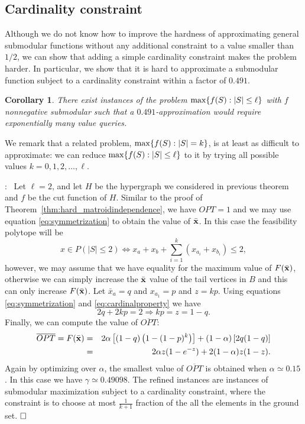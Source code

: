 \documentclass{article}[11pt]
\newtheorem{corollary}[theorem]{Corollary}
\renewenvironment{proof}{\noindent{\bf Proof}:~}{$\hfill \Box$\\}
\def\bx{{\bf x}}
\def\max{{\rm{max}}}
\begin{document}
\subsection{Cardinality constraint}

Although we do not know how to improve the hardness of approximating general submodular
functions without any additional constraint to a value smaller than $1/2$, we can show
that adding a simple cardinality constraint makes the problem harder. In particular,
we show that it is hard to approximate a submodular function subject to a cardinality
constraint within a factor of $0.491$. 

\begin{corollary}
There exist instances of the problem $\max\{f(S):|S| \leq \ell\}$ with $f$ nonnegative submodular
such that a $0.491$-approximation would require exponentially many value queries.
\end{corollary} 

We remark that a related problem, $\max \{f(S): |S|=k\}$, is at least as difficult
to approximate: we can reduce $\max \{f(S): |S| \leq \ell\}$ to it by trying
all possible values $k=0,1,2,\ldots,\ell$.

\medskip

\begin{proof}
Let $\ell=2$, and let $H$ be the hypergraph we considered in previous theorem
and $f$ be the cut function of $H$. Similar to the proof of 
Theorem~\ref{thm:hard_matroidindependence}, we have $OPT=1$ and we may use
equation \eqref{eq:symmetrization} to obtain the value of $\bar{\bx}$.
In this case the feasibility polytope will be
\begin{equation}
\label{eq:cardinalproperty}
x\in P(|S|\leq 2) \Leftrightarrow 
 x_a+x_b+\sum_{i=1}^k (x_{a_i}+x_{b_i})\leq 2,
\end{equation}
however, we may assume that we have equality for the maximum value of $F(\bar{\bx})$,
otherwise we can simply increase the $\bar{\bx}$ value of the tail vertices in $B$
and this can only increase $F(\bar{\bx})$. Let $\bar{x}_a=q$ and $x_{a_1}=p$ and $z=kp$.
Using equations \eqref{eq:symmetrization} and \eqref{eq:cardinalproperty} we have
$$
2q + 2kp=2 \Rightarrow kp=z=1-q.
$$
Finally, we can compute the value of $\overline{OPT}$:
\begin{eqnarray*}
\overline{OPT}=F(\bar{\bx}) & = & 2\alpha\left[(1-q) \left(1-(1-p)^k\right)\right]
 + (1-\alpha)\left[2q(1-q)\right]\\
 & = & 2\alpha z(1-e^{-z}) + 2(1-\alpha)z(1-z).
\end{eqnarray*}
Again by optimizing over $\alpha$, the smallest value of $\overline{OPT}$
is obtained when $\alpha \simeq 0.15$. In this case we have $\gamma \simeq 0.49098$.
The refined instances are instances of submodular maximization
subject to a cardinality constraint, where the constraint is to choose at most
$\frac{1}{k+1}$ fraction of the all the elements in the ground set.
\end{proof}
\end{document}
